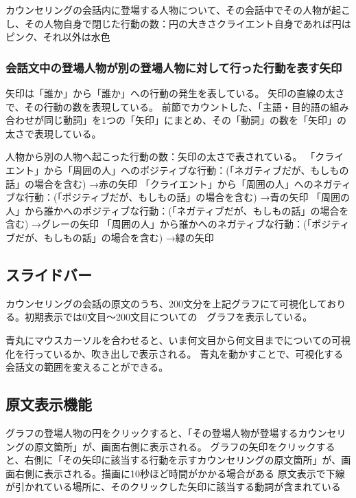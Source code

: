 \documentclass[shuuron]{kuee}
\begin{document}
カウンセリングの会話内に登場する人物について、その会話中でその人物が起こし、その人物自身で閉じた行動の数：円の大きさクライエント自身であれば円はピンク、それ以外は水色


\subsubsection{会話文中の登場人物が別の登場人物に対して行った行動を表す矢印}

矢印は「誰か」から「誰か」への行動の発生を表している。
矢印の直線の太さで、その行動の数を表現している。
前節でカウントした、「主語・目的語の組み合わせが同じ動詞」を1つの「矢印」にまとめ、その「動詞」の数を「矢印」の太さで表現している。

人物から別の人物へ起こった行動の数：矢印の太さで表されている。
「クライエント」から「周囲の人」へのポジティブな行動：(「ネガティブだが、もしもの話」の場合を含む)
→赤の矢印
「クライエント」から「周囲の人」へのネガティブな行動：(「ポジティブだが、もしもの話」の場合を含む)
→青の矢印
「周囲の人」から誰かへのポジティブな行動：(「ネガティブだが、もしもの話」の場合を含む)
→グレーの矢印
「周囲の人」から誰かへのネガティブな行動：(「ポジティブだが、もしもの話」の場合を含む)
→緑の矢印



\subsection{スライドバー}

カウンセリングの会話の原文のうち、200文分を上記グラフにて可視化しておりる。初期表示では0文目〜200文目についての　グラフを表示している。

青丸にマウスカーソルを合わせると、いま何文目から何文目までについての可視化を行っているか、吹き出しで表示される。
青丸を動かすことで、可視化する会話文の範囲を変えることができる。


\subsection{原文表示機能}

グラフの登場人物の円をクリックすると、「その登場人物が登場するカウンセリングの原文箇所」が、画面右側に表示される。
グラフの矢印をクリックすると、右側に「その矢印に該当する行動を示すカウンセリングの原文箇所」が、画面右側に表示される。描画に10秒ほど時間がかかる場合がある
原文表示で下線が引かれている場所に、そのクリックした矢印に該当する動詞が含まれている
\end{document}
